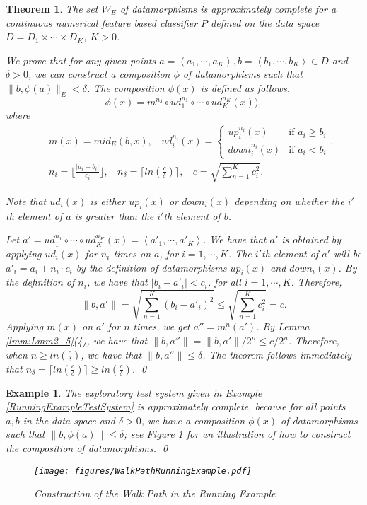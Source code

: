 \documentclass[preprint,1p,authoryear,times]{elsarticle}
\newtheorem{Theorem} {Theorem}
\newtheorem{Example}{Example}
\begin{document}
\begin{Theorem}\label{thm:Thm2_6}
The set $W_E$ of datamorphisms is approximately complete for a continuous numerical feature based classifier $P$ defined on the data space $D = D_1 \times \cdots \times D_K$, $K>0$. 

We prove that for any given points $a=\left<a_1, \cdots, a_K\right>, b=\left<b_1, \cdots, b_K\right> \in D$ and $\delta > 0$, we can construct a composition $\phi$ of datamorphisms such that $\|b, \phi(a)\|_E <\delta$. The composition $\phi(x)$ is defined as follows. 
\begin{equation}
\phi(x) = m^{n_\delta} \circ ud^{n_1}_1 \circ \cdots \circ ud^{n_K}_K(x)),
\end{equation}
where 
\begin{eqnarray*}
&&m(x) = mid_E(b, x), 
~~~~ud^{n_i}_i(x) = \left\{ \begin{array}{ll}
up^{n_i}_i(x) & \textrm{if $a_i \geq b_i$}\\
down^{n_i}_i(x) & \textrm{if $a_i < b_i$}
\end{array} \right., \\
&&n_i = \lfloor \frac{|a_i - b_i|} {c_i} \rfloor, 
~~~~ n_\delta = \lceil ln(\frac{c}{\delta})\rceil, 
~~~~ c=\sqrt{\sum_{n=1}^K{c_i^2}}.
\end{eqnarray*}

Note that $ud_i(x)$ is either $up_i(x)$ or $down_i(x)$ depending on whether the $i'$th element of $a$ is greater than the $i'$th element of $b$. 

Let $a'=ud^{n_1}_1 \circ \cdots \circ ud^{n_K}_K(x)=\left<a'_1, \cdots, a'_K\right>$. We have that $a'$ is obtained by applying $ud_i(x)$ for $n_i$ times on $a$, for $i=1, \cdots, K$. The $i'$th element of $a'$ will be $a'_i = a_i \pm n_i \cdot c_i$ by the definition of datamorphisms $up_i(x)$ and $down_i(x)$. By the definition of $n_i$, we have that $|b_i-a'_i| < c_i$, for all $i=1,\cdots,K$. Therefore, \[\|b,a'\| = \sqrt{\sum_{n=1}^K{(b_i-a'_i)^2}} \leq \sqrt{\sum_{n=1}^K{c_i^2}}=c.\] 
Applying $m(x)$ on $a'$ for $n$ times, we get $a'' = m^n(a')$. By Lemma \ref{lmm:Lmm2_5}(4), we have that $\|b, a''\|=\|b, a'\|/2^n \leq c/2^n$. Therefore, when $n \geq ln(\frac{c}{\delta})$, we have that $\|b, a''\| \leq \delta$. The theorem follows immediately that $n_\delta = \lceil ln(\frac{c}{\delta})\rceil \geq ln(\frac{c}{\delta})$. \qed
\end{Theorem}

\begin{Example}
The exploratory test system given in Example \ref{RunningExampleTestSystem} is approximately complete, because for all points $a, b$ in the data space and $\delta >0$, we have a composition $\phi(x)$ of datamorphisms such that $\|b, \phi(a)\| \leq \delta$; see Figure \ref{fig:WalkingPath} for an illustration of how to construct the composition of datamorphisms. \qed

\begin{figure}[htbp]
	\centering
	\texttt{[image: figures/WalkPathRunningExample.pdf]}
	\caption{Construction of the Walk Path in the Running Example}
	\label{fig:WalkingPath}
\end{figure}
\end{Example}
\end{document}
